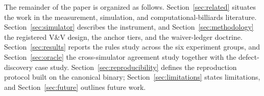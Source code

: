 The remainder of the paper is organized as follows.
Section~\ref{sec:related} situates the work in the measurement,
simulation, and computational-billiards literature.
Section~\ref{sec:simulator} describes the instrument, and
Section~\ref{sec:methodology} the registered V\&V design, the anchor
tiers, and the waiver-ledger doctrine. Section~\ref{sec:results} reports
the rules study across the six experiment groups, and
Section~\ref{sec:oracle} the cross-simulator agreement study together
with the defect-discovery case study. Section~\ref{sec:reproducibility}
defines the reproduction protocol built on the canonical binary;
Section~\ref{sec:limitations} states limitations, and
Section~\ref{sec:future} outlines future work.
